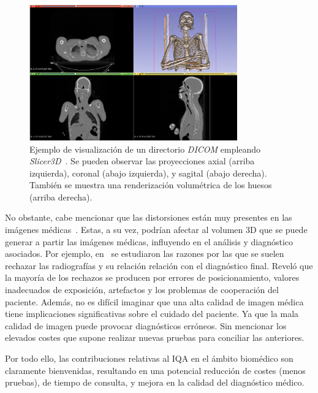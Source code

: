\begin{figure}[htp]
  \begin{center}
    \includegraphics[width=0.8\textwidth]{imagenes/chapter1/SlicerVisualization}
  \end{center}
  \caption[Ejemplo de visualización de un directorio DICOM.]{Ejemplo de visualización de un directorio \emph{DICOM}
    empleando \emph{Slicer3D}~\cite{Slicer3D}. Se pueden observar
  las proyecciones axial (arriba izquierda), coronal (abajo izquierda),
  y sagital (abajo derecha). También se muestra una renderización volumétrica
de los huesos (arriba derecha).
} 
  \label{fig:SlicerVisualization}
\end{figure}

No obstante, cabe mencionar que las distorsiones
están muy presentes en las imágenes médicas~\cite{MedicalImpactOfDistortions}.
Estas, a su vez, podrían afectar al volumen 3D que se puede generar a partir 
las imágenes médicas, influyendo en el análisis y diagnóstico asociados. Por ejemplo, 
 en~\cite{XrayRejectionFactor} se estudiaron las razones por las que se suelen 
rechazar las radiografías y su relación relación con el diagnóstico final. 
Reveló que la mayoría de los rechazos se producen por 
errores de posicionamiento, valores inadecuados de exposición, artefactos 
y los problemas de cooperación del paciente. 
Además, no es difícil imaginar que una alta 
calidad de imagen médica tiene implicaciones significativas sobre el cuidado
del paciente. Ya que la mala calidad de imagen puede provocar diagnósticos erróneos. 
Sin mencionar los elevados costes que supone realizar 
nuevas pruebas para conciliar las anteriores. 

Por todo ello, las contribuciones relativas al IQA en el 
ámbito biomédico son claramente bienvenidas, resultando en 
una potencial reducción de costes (menos pruebas), de tiempo de consulta, y mejora 
en la calidad del diagnóstico médico. 

